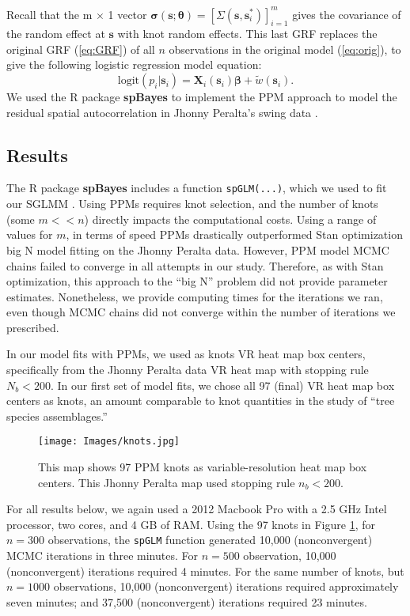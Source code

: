 Recall that the m $\times$ 1 vector $\pmb{\sigma}(\pmb{s};\pmb{\theta}) = \left[\Sigma(\pmb{s}, \pmb{s}_{i}^{*})\right]_{i = 1}^{m}$ gives the covariance of the random effect at $\pmb{s}$ with knot random effects. This last GRF replaces the original GRF (\ref{eq:GRF}) of all $n$ observations in the original model (\ref{eq:orig}), to give the following logistic regression model equation:
\begin{equation}
\text{logit}(p_{i}|\pmb{s}_{i}) = \pmb{X}_{i}(\pmb{s}_{i}) \pmb{\beta} + \tilde{w}(\pmb{s}_{i}).
\end{equation}
We used the R package {\bf spBayes} \citep{Finley2013} to implement the PPM approach to model the residual spatial autocorrelation in Jhonny Peralta's swing data . 

\subsection{Results} \label{PPMresults}

The R package {\bf spBayes} includes a function \verb|spGLM(...)|, which we used to fit our SGLMM \citep{Finley2013}. Using PPMs requires knot selection, and the number of knots (some $m < < n$) directly impacts the computational costs. Using a range of values for $m$, in terms of speed PPMs drastically outperformed Stan optimization big N model fitting on the Jhonny Peralta data. However, PPM model MCMC chains failed to converge in all attempts in our study. Therefore, as with Stan optimization, this approach to the ``big N'' problem did not provide parameter estimates. Nonetheless, we provide computing times for the iterations we ran, even though MCMC chains did not converge within the number of iterations we prescribed.

In our model fits with PPMs, we used as knots VR heat map box centers, specifically from the Jhonny Peralta data VR heat map with stopping rule $N_{b} < 200$. In our first set of model fits, we chose all 97 (final) VR heat map box centers as knots, an amount comparable to knot quantities in the \cite{Finley2009_2} study of ``tree species assemblages.'' 
  \begin{figure}[H]
	\centering 
	\texttt{[image: Images/knots.jpg]}
	\caption{This map shows 97 PPM knots as variable-resolution heat map box centers. This Jhonny Peralta map used stopping rule $n_{b} < 200$.}
	\label{fig:knots}
	\end{figure}
For all results below, we again used a 2012 Macbook Pro with a 2.5 GHz Intel processor, two cores, and 4 GB of RAM. Using the 97 knots in Figure \ref{fig:knots}, for $n = 300$ observations, the \verb|spGLM| function generated 10,000 (nonconvergent) MCMC iterations in three minutes. For $n = 500$ observation, 10,000 (nonconvergent) iterations required 4 minutes. For the same number of knots, but $n = 1000$ observations, 10,000 (nonconvergent) iterations required approximately seven minutes; and 37,500 (nonconvergent) iterations required 23 minutes. 

